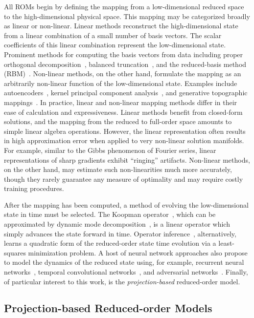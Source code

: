All ROMs begin by defining the mapping from a low-dimensional reduced space to the high-dimensional physical space. This mapping may be categorized broadly as linear or non-linear. Linear methods reconstruct the high-dimensional state from a linear combination of a small number of basis vectors. The scalar coefficients of this linear combination represent the low-dimensional state. Prominent methods for computing the basis vectors from data including proper orthogonal decomposition~\cite{berkoozPOD}, balanced truncation~\cite{Gugercin2004}, and the reduced-basis method (RBM)~\cite{reducedBasisBook}. Non-linear methods, on the other hand, formulate the mapping as an arbitrarily non-linear function of the low-dimensional state. Examples include autoencoders~\cite{Kramer1991}, kernel principal component analysis~\cite{kernelPCA}, and generative topographic mappings~\cite{Bishop1997}. In practice, linear and non-linear mapping methods differ in their ease of calculation and expressiveness. Linear methods benefit from closed-form solutions, and the mapping from the reduced to full-order space amounts to simple linear algebra operations. However, the linear representation often results in high approximation error when applied to very non-linear solution manifolds. For example, similar to the Gibbs phenomenon of Fourier series, linear representations of sharp gradients exhibit ``ringing'' artifacts. Non-linear methods, on the other hand, may estimate such non-linearities much more accurately, though they rarely guarantee any measure of optimality and may require costly training procedures.

After the mapping has been computed, a method of evolving the low-dimensional state in time must be selected. The Koopman operator~\cite{Budisic2012}, which can be approximated by dynamic mode decomposition~\cite{Schmid2010}, is a linear operator which simply advances the state forward in time. Operator inference~\cite{Peherstorfer2016}, alternatively, learns a quadratic form of the reduced-order state time evolution via a least-squares minimization problem. A host of neural network approaches also propose to model the dynamics of the reduced state using, for example, recurrent neural networks~\cite{Gonzalez2018}, temporal convolutional networks~\cite{Xu2020}, and adversarial networks~\cite{QuilodranCasas2021}. Finally, of particular interest to this work, is the \textit{projection-based} reduced-order model.

\subsection{Projection-based Reduced-order Models}

